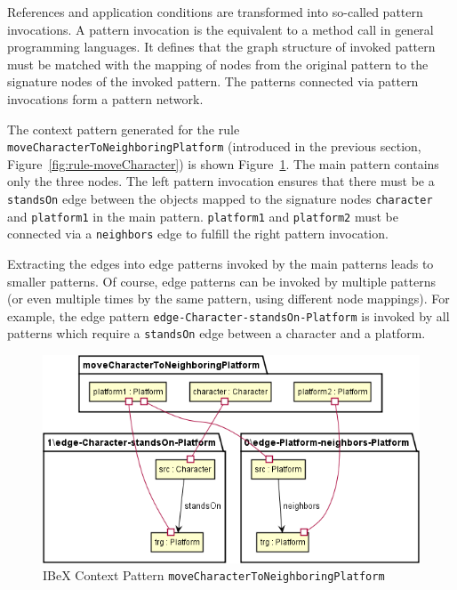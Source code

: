 \noindent
References and application conditions are transformed into so-called pattern invocations.
A pattern invocation is the equivalent to a method call in general programming languages.
It defines that the graph structure of invoked pattern must be matched with the mapping of nodes from the original pattern to the signature nodes of the invoked pattern.
The patterns connected via pattern invocations form a pattern network.

The context pattern generated for the rule \texttt{moveCharacterToNeighboringPlatform} (introduced in the previous section, Figure~\ref{fig:rule-moveCharacter}) is shown Figure~\ref{fig:ibex-pattern-moveCharacterToNeighboringPlatform}.
The main pattern contains only the three nodes.
The left pattern invocation ensures that there must be a \texttt{standsOn} edge between the objects mapped to the signature nodes \texttt{character} and \texttt{platform1} in the main pattern.
\texttt{platform1} and \texttt{platform2} must be connected via a \texttt{neighbors} edge to fulfill the right pattern invocation.

Extracting the edges into edge patterns invoked by the main patterns leads to smaller patterns.
Of course, edge patterns can be invoked by multiple patterns (or even multiple times by the same pattern, using different node mappings).
For example, the edge pattern \texttt{edge-Character-standsOn-Platform} is invoked by all patterns which require a \texttt{standsOn} edge between a character and a platform.

\begin{figure}[h!]
	\centering
	\includegraphics[scale=0.7]{../common/figures/ibex-pattern-moveCharacterToNeighboringPlatform}
	\caption{IBeX Context Pattern \texttt{moveCharacterToNeighboringPlatform}}
	\label{fig:ibex-pattern-moveCharacterToNeighboringPlatform}
\end{figure}

